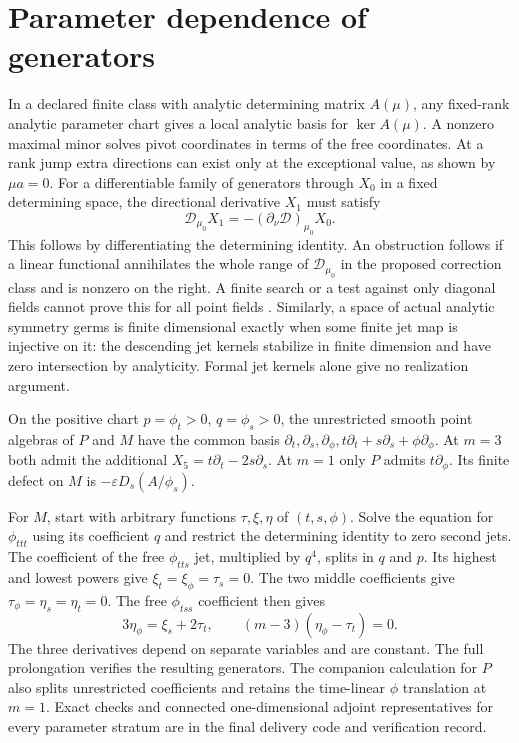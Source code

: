 \documentclass[12pt,a4paper,oneside]{report}
\numberwithin{equation}{chapter}
\theoremstyle{remark}\newtheorem{remark}[theorem]{Remark}
\begin{document}
\section{Parameter dependence of generators}
In a declared finite class with analytic determining matrix $A(\mu)$, any fixed-rank analytic parameter chart gives a local analytic basis for $\ker A(\mu)$. A nonzero maximal minor solves pivot coordinates in terms of the free coordinates. At a rank jump extra directions can exist only at the exceptional value, as shown by $\mu a=0$. For a differentiable family of generators through $X_0$ in a fixed determining space, the directional derivative $X_1$ must satisfy
\begin{equation}\label{eq:continue}
 \mathscr D_{\mu_0} X_1=-(\partial_\nu\mathscr D)_{\mu_0}X_0.
\end{equation}
This follows by differentiating the determining identity. An obstruction follows if a linear functional annihilates the whole range of $\mathscr D_{\mu_0}$ in the proposed correction class and is nonzero on the right. A finite search or a test against only diagonal fields cannot prove this for all point fields \cite{dengreid2024}. Similarly, a space of actual analytic symmetry germs is finite dimensional exactly when some finite jet map is injective on it: the descending jet kernels stabilize in finite dimension and have zero intersection by analyticity. Formal jet kernels alone give no realization argument.

On the positive chart $p=\phi_t>0$, $q=\phi_s>0$, the unrestricted smooth point algebras of $P$ and $M$ have the common basis $\partial_t,\partial_s,\partial_\phi,t\partial_t+s\partial_s+\phi\partial_\phi$. At $m=3$ both admit the additional $X_5=t\partial_t-2s\partial_s$. At $m=1$ only $P$ admits $t\partial_\phi$. Its finite defect on $M$ is $-\varepsilon D_s(A/\phi_s)$.

For $M$, start with arbitrary functions $\tau,\xi,\eta$ of $(t,s,\phi)$. Solve the equation for $\phi_{ttt}$ using its coefficient $q$ and restrict the determining identity to zero second jets. The coefficient of the free $\phi_{tts}$ jet, multiplied by $q^4$, splits in $q$ and $p$. Its highest and lowest powers give $\xi_t=\xi_\phi=\tau_s=0$. The two middle coefficients give $\tau_\phi=\eta_s=\eta_t=0$. The free $\phi_{tss}$ coefficient then gives
\[
 3\eta_\phi=\xi_s+2\tau_t,\qquad (m-3)(\eta_\phi-\tau_t)=0 .
\]
The three derivatives depend on separate variables and are constant. The full prolongation verifies the resulting generators. The companion calculation for $P$ also splits unrestricted coefficients and retains the time-linear $\phi$ translation at $m=1$. Exact checks and connected one-dimensional adjoint representatives for every parameter stratum are in the final delivery code and verification record.
\end{document}
